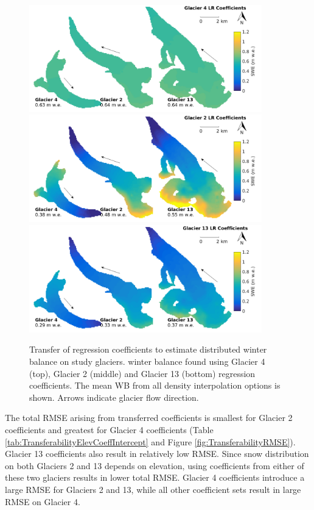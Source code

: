 \documentclass{sfuthesis}
\begin{document}
\begin{figure}
	\centering
	\includegraphics[width =0.9\textwidth]{MapTransferabilityG4Coeffs.png}\\
	\includegraphics[width =0.9\textwidth]{MapTransferabilityG2Coeffs.png}\\
	\includegraphics[width =0.9\textwidth]{MapTransferabilityG13Coeffs.png}\\
	\caption{Transfer of regression coefficients to estimate distributed winter balance on study glaciers. winter balance found using Glacier 4 (top), Glacier 2 (middle) and Glacier 13 (bottom) regression coefficients. The mean WB from all density interpolation options is shown. Arrows indicate glacier flow direction.}
	\label{fig:MapTransferabilityGlaciersMean}
\end{figure}

The total RMSE arising from transferred coefficients is smallest for Glacier 2 coefficients and greatest for Glacier 4 coefficients (Table \ref{tab:TransferabilityElevCoeffIntercept} and Figure \ref{fig:TransferabilityRMSE}). Glacier 13 coefficients also result in relatively low RMSE. Since snow distribution on both Glaciers 2 and 13 depends on elevation, using coefficients from either of these two glaciers results in lower total RMSE. Glacier 4 coefficients introduce a large RMSE for Glaciers 2 and 13, while all other coefficient sets result in large RMSE on Glacier 4. 
\end{document}
